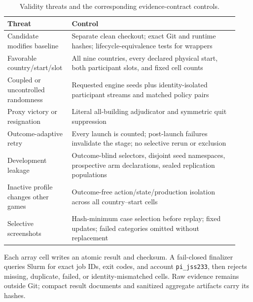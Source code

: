 \begin{table}[t]
\centering
\caption{Validity threats and the corresponding evidence-contract controls.}
\label{tab:threats}
\small
\begin{tabular}{@{}p{0.24\linewidth}p{0.69\linewidth}@{}}
\toprule
Threat & Control \\
\midrule
Candidate modifies baseline & Separate clean checkout; exact Git and runtime
hashes; lifecycle-equivalence tests for wrappers \\
Favorable country/start/slot & All nine countries, every declared physical
start, both participant slots, and fixed cell counts \\
Coupled or uncontrolled randomness & Requested engine seeds plus
identity-isolated participant streams and matched policy pairs \\
Proxy victory or resignation & Literal all-building adjudicator and symmetric
quit suppression \\
Outcome-adaptive retry & Every launch is counted; post-launch failures
invalidate the stage; no selective rerun or exclusion \\
Development leakage & Outcome-blind selectors, disjoint seed namespaces,
prospective arm declarations, sealed replication populations \\
Inactive profile changes other games & Outcome-free action/state/production
isolation across all country--start cells \\
Selective screenshots & Hash-minimum case selection before replay; fixed
updates; failed categories omitted without replacement \\
\bottomrule
\end{tabular}
\end{table}

Each array cell writes an atomic result and checksum. A fail-closed finalizer
queries Slurm for exact job IDs, exit codes, and account \texttt{pi\_jss233},
then rejects missing, duplicate, failed, or identity-mismatched cells. Raw
evidence remains outside Git; compact result documents and sanitized aggregate
artifacts carry its hashes.
